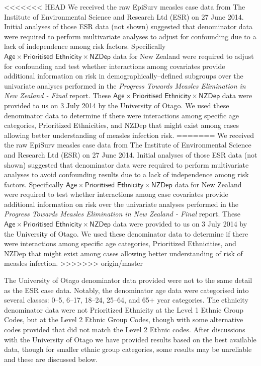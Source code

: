 \documentclass{article}
\begin{document}
\begin{itemize}
<<<<<<< HEAD
We received the raw EpiSurv measles case data from The Institute of Environmental Science and Research Ltd (ESR) on 27 June 2014. Initial analyses of those ESR data (not shown) suggested that denominator data were required to perform multivariate analyses to adjust for confounding due to a lack of independence among risk factors. Specifically $\textsf{Age} \times \textsf{Prioritised Ethnicity} \times \textsf{NZDep}$ data for New Zealand were required to adjust for confounding and test whether interactions among covariates provide additional information on risk in demographically--defined subgroups over the univariate analyses performed in the \emph{Progress Towards Measles Elimination in New Zealand - Final} report. These $\textsf{Age} \times \textsf{Prioritised Ethnicity} \times \textsf{NZDep}$ data were provided to us on 3 July 2014 by the University of Otago. We used these denominator data to determine if there were interactions among specific age categories, Prioritized Ethnicities, and NZDep that might exist among cases allowing better understanding of measles infection risk.
=======
We received the raw EpiSurv measles case data from The Institute of Environmental Science and Research Ltd (ESR) on 27 June 2014. Initial analyses of those ESR data (not shown) suggested that denominator data were required to perform multivariate analyses to avoid confounding results due to a lack of independence among risk factors. Specifically $\textsf{Age} \times \textsf{Prioritised Ethnicity} \times \textsf{NZDep}$ data for New Zealand were required to test whether interactions among case covariates provide additional information on risk over the univariate analyses performed in the \emph{Progress Towards Measles Elimination in New Zealand - Final} report. These $\textsf{Age} \times \textsf{Prioritised Ethnicity} \times \textsf{NZDep}$ data were provided to us on 3 July 2014 by the University of Otago. We used these denominator data to determine if there were interactions among specific age categories, Prioritized Ethnicities, and NZDep that might exist among cases allowing better understanding of risk of measles infection.
>>>>>>> origin/master

The University of Otago denominator data provided were not to the same detail as the ESR case data. Notably, the denominator age data were categorised into several classes: 0--5, 6--17, 18--24, 25--64, and 65+ year categories. The ethnicity denominator data were not Prioritized Ethnicity at the Level 1 Ethnic Group Codes, but at the Level 2 Ethnic Group Codes, though with some alternative codes provided that did not match the Level 2 Ethnic codes. After discussions with the University of Otago we have provided results based on the best available data, though for smaller ethnic group categories, some results may be unreliable and these are discussed below.


\end{itemize}
\end{document}
